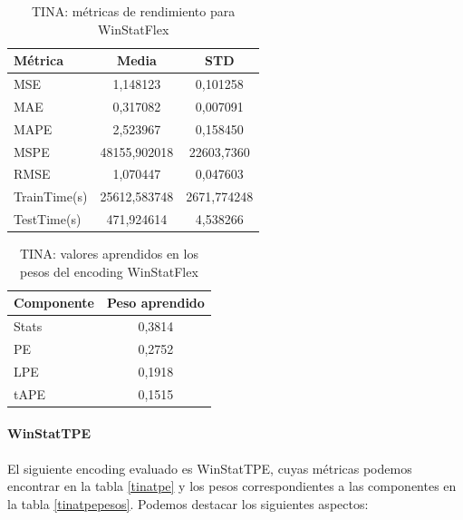 \begin{table}[!ht]
	\centering
	\begin{tabular}{l|c|c}
		\toprule
		Métrica & Media & STD \\
		\midrule
		MSE & 1,148123 & 0,101258 \\
		MAE & 0,317082 & 0,007091 \\
		MAPE & 2,523967 & 0,158450 \\
		MSPE & 48155,902018 & 22603,7360 \\
		RMSE & 1,070447 & 0,047603 \\
		TrainTime(s) & 25612,583748 & 2671,774248 \\
		TestTime(s) & 471,924614 & 4,538266 \\
		\bottomrule
	\end{tabular}
	\caption{TINA: métricas de rendimiento para WinStatFlex}
	\label{tinaflex}
\end{table}
 
\begin{table}[!ht]
	\centering
	\begin{tabular}{l|c}
		\toprule
		Componente & Peso aprendido \\
		\midrule
		Stats & 0,3814 \\
		PE & 0,2752 \\
		LPE & 0,1918 \\
		tAPE & 0,1515 \\
		\bottomrule
	\end{tabular}
	\caption{TINA: valores aprendidos en los pesos del encoding WinStatFlex}
	\label{tinaflexpesos}
\end{table}

\paragraph{WinStatTPE}

El siguiente encoding evaluado es WinStatTPE, cuyas métricas podemos encontrar en la tabla \ref{tinatpe} y los pesos correspondientes a las componentes en la tabla \ref{tinatpepesos}. Podemos destacar los siguientes aspectos:

